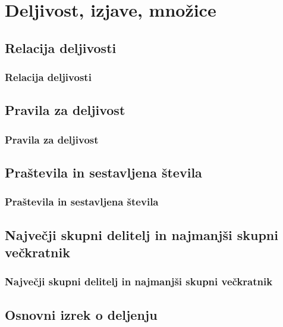 \section{Deljivost, izjave, množice}

\begin{frame}
    \sectionpage
\end{frame}

\begin{frame}
\end{frame}

    \subsection{Relacija deljivosti}

        \begin{frame}
            \frametitle{Relacija deljivosti}
        \end{frame}

    \subsection{Pravila za deljivost}

        \begin{frame}
            \frametitle{Pravila za deljivost}
        \end{frame}

    \subsection{Praštevila in sestavljena števila}

        \begin{frame}
            \frametitle{Praštevila in sestavljena števila}
        \end{frame}

    \subsection{Največji skupni delitelj in najmanjši skupni večkratnik}

        \begin{frame}
            \frametitle{Največji skupni delitelj in najmanjši skupni večkratnik}
        \end{frame}

    \subsection{Osnovni izrek o deljenju}

